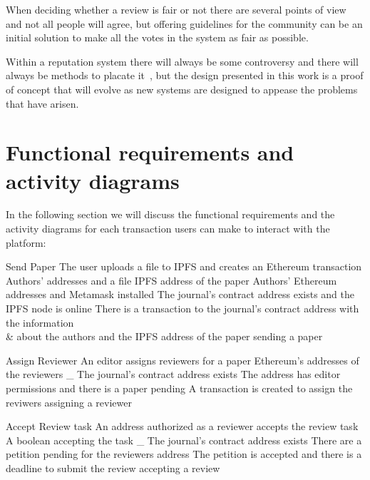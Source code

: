 When deciding whether a review is fair or not there are several points of
view~\cite{daniel1993guardians,cole1979fair} and not all people will agree, but
offering guidelines for the community can be an initial solution to make all the
votes in the system as fair as possible.

Within a reputation system there will always be some controversy and there will
always be methods to placate it~\cite{dellarocas2000immunizing}, but the design
presented in this work is a proof of concept that will evolve as new systems are
designed to appease the problems that have arisen.


\section{Functional requirements and activity diagrams}

In the following section we will discuss the functional requirements and the
activity diagrams for each transaction users can make to interact with the
platform:


{Send Paper}%
{The user uploads a file to IPFS and creates an Ethereum
  transaction}%
{Authors' addresses and a file}%
{IPFS address of the paper}%
{Authors' Ethereum addresses and Metamask installed}%
{The journal's contract address exists and the IPFS node is
  online}%
{There is a transaction to the journal's contract address with the information\\
  & about the authors and the IPFS address of the paper }%
{sending a paper}%

{Assign Reviewer}%
{An editor assigns reviewers for a paper}%
{Ethereum's addresses of the reviewers}%
{_}%
{The journal's contract address exists} {The address has editor permissions and
  there is a paper pending}%
{A transaction is created to assign the reviwers}%
{assigning a reviewer}%

{Accept Review task}%
{An address authorized as a reviewer accepts the review
  task}%
{A boolean accepting the task}%
{_}%
{The journal's contract address exists}%
{There are a petition pending for the reviewers address}%
{The petition is accepted and there is a deadline to submit the
  review}%
{accepting a review}%

